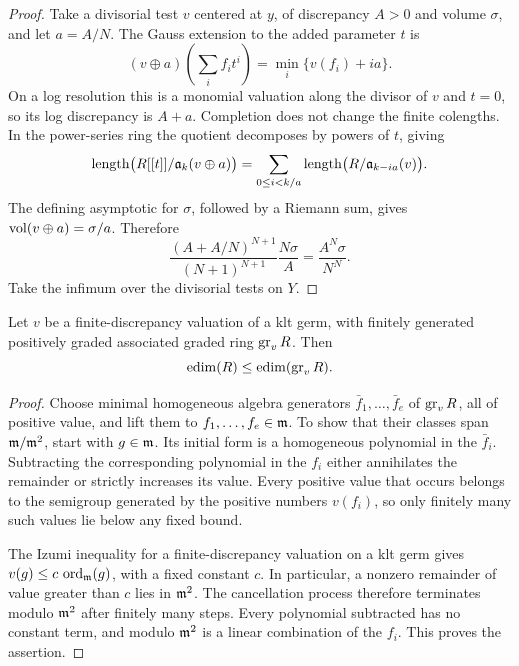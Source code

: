 \begin{proof}
Take a divisorial test \(v\) centered at \(y\), of discrepancy
\(A>0\) and volume \(\sigma\), and let \(a=A/N\).
The Gauss extension to the added parameter \(t\) is
\[
       (v\oplus a)\left(\sum_i f_it^i\right)
                    =\min_i\{v(f_i)+ia\}.
\]
On a log resolution this is a monomial valuation along the divisor
of \(v\) and \(t=0\), so its log discrepancy is \(A+a\).
Completion does not change the finite colengths. In the power-series
ring the quotient decomposes by powers of \(t\), giving
\[
 \operatorname{length}\bigl(R[[t]]/\mathfrak a_k(v\oplus a)\bigr)
   =\sum_{0\le i<k/a}\operatorname{length}\bigl(R/\mathfrak a_{k-ia}(v)\bigr).
\]
The defining asymptotic for \(\sigma\), followed by a Riemann sum,
gives \(\operatorname{vol}(v\oplus a)=\sigma/a\). Therefore
\[
 \frac{(A+A/N)^{N+1}}{(N+1)^{N+1}}\frac{N\sigma}{A}
                   =\frac{A^N\sigma}{N^N}.
\]
Take the infimum over the divisorial tests on \(Y\).
\end{proof}

\begin{lemma}\label{cone:edim}
Let \(v\) be a finite-discrepancy valuation of a klt germ, with
finitely generated positively graded associated graded ring
\(\operatorname{gr}_v R\). Then
\[
                \operatorname{edim}(R)\le\operatorname{edim}(\operatorname{gr}_v R).
\]
\end{lemma}

\begin{proof}
Choose minimal homogeneous algebra generators
\(\bar f_1,\ldots,\bar f_e\) of \(\operatorname{gr}_v R\), all of positive value,
and lift them to \(f_1,\ldots,f_e\in\mathfrak m\). To show that their
classes span \(\mathfrak m/\mathfrak m^2\), start with \(g\in\mathfrak m\). Its initial
form is a homogeneous polynomial in the \(\bar f_i\). Subtracting
the corresponding polynomial in the \(f_i\) either annihilates
the remainder or strictly increases its value. Every positive
value that occurs belongs to the semigroup generated by the
positive numbers \(v(f_i)\), so only finitely many such values
lie below any fixed bound.

The Izumi inequality for a finite-discrepancy valuation on a klt
germ \cite[Theorem~3.1]{Li18} gives
\(v(g)\le c\,\operatorname{ord}_{\mathfrak m}(g)\), with a fixed constant
\(c\). In particular, a nonzero remainder of value greater than
\(c\) lies in \(\mathfrak m^2\). The cancellation process therefore
terminates modulo \(\mathfrak m^2\) after finitely many steps. Every
polynomial subtracted has no constant term, and modulo
\(\mathfrak m^2\) is a linear combination of the \(f_i\). This proves
the assertion.
\end{proof}

